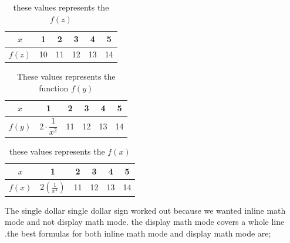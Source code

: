 \documentclass[a4paper,12pt]{article}
\begin{document}
  		\begin{table}[ht]
  			\centering
  			\caption{these values represents the $f(z)$}
  	\def\arraystretch{1.9}
  		 \begin{tabular}{|c||c|c|c|c|c|}
  		 \hline
  		 \(x\) & 1 	& 2 & 3 & 4 & 5\\ \hline
  		 $f(z)$ & 10 & 11 & 12 & 13 & 14\\ \hline
  		 \end{tabular}
  		 \end{table}
  		 
  		 
  		 
  		 
  		 
  		 \vspace{30pt}
  		 
  		 
  		 
  		 
  		 
  		 
  		 \begin{table}
  		 	\centering
  		 	 \caption{These values represents the function $f(y)$}
  		\def\arraystretch{2.4}
  		  \begin{tabular}{|c||c|c|c|c|c|}
  		 	\hline
  		 	$x$ & 1 & 2 & 3 & 4 & 5\\ \hline
  		 	$f(y)$ & $2\cdot \dfrac{1}{x^2} $ & 11 & 12 & 13 & 14\\ \hline
  		 \end{tabular}
  		 \end{table}
  		 
  		 \vspace{40pt}
  		 
  		 
  		 
  		 
  		 
  		 
  		 \def\arraystretch{2.5}
  		 \begin{table}
  		 \centering
  		 \begin{tabular}{|c||c|c|c|c|c|}
  		 	\hline
  		 	
  		 	$x$ & 1 & 2 & 3 & 4 & 5\\ \hline
  		 	$f(x)$ & $2\displaystyle\left(\frac{1}{x^2}\right)$ & 11 & 12 & 13 & 14\\ \hline
  		 	\end{tabular}
  		 	\caption{these values represents the $f(x)$}
  		 	\end{table}
  		 The single dollar single dollar sign worked out because we wanted inline math mode and not display math mode. the display math mode covers a whole line .the best formulas for both inline math mode and display math mode are; 
  		 
\end{document}
